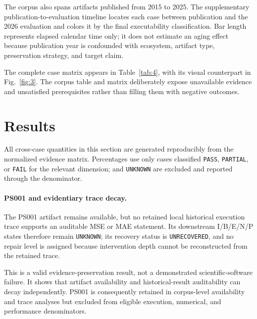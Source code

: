 \documentclass[a4paper,fleqn]{cas-dc}
\begin{document}
The corpus also spans artifacts published from 2015 to 2025. The supplementary publication-to-evaluation timeline locates each case between publication and the 2026 evaluation and colors it by the final executability classification. Bar length represents elapsed calendar time only; it does not estimate an aging effect because publication year is confounded with ecosystem, artifact type, preservation strategy, and target claim.


The complete case matrix appears in Table~\ref{tab:4}, with its visual counterpart in Fig.~\ref{fig:3}. The corpus table and matrix deliberately expose unavailable evidence and unsatisfied prerequisites rather than filling them with negative outcomes.

\section{Results}

All cross-case quantities in this section are generated reproducibly from the normalized evidence matrix. Percentages use only cases classified \texttt{PASS}, \texttt{PARTIAL}, or \texttt{FAIL} for the relevant dimension; \protect{} and \texttt{UNKNOWN} are excluded and reported through the denominator.

\paragraph{PS001 and evidentiary trace decay.}

The PS001 artifact remains available, but no retained local historical execution trace supports an auditable MSE or MAE statement. Its downstream I/B/E/N/P states therefore remain \texttt{UNKNOWN}; its recovery status is \texttt{UNRECOVERED}, and no repair level is assigned because intervention depth cannot be reconstructed from the retained trace.

This is a valid evidence-preservation result, not a demonstrated scientific-software failure. It shows that artifact availability and historical-result auditability can decay independently. PS001 is consequently retained in corpus-level availability and trace analyses but excluded from eligible execution, numerical, and performance denominators.
\end{document}
